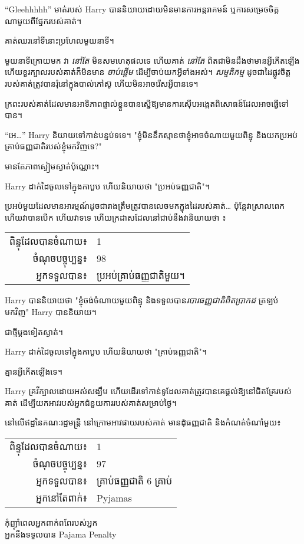 “Gleehhhhh” មាត់របស់ Harry បាននិយាយដោយមិនមានការអន្តរាគមន៍ ឬការសម្រេចចិត្តណាមួយពីផ្នែករបស់គាត់។

គាត់ឈរនៅទីនោះប្រហែលមួយនាទី។

មួយនាទីក្រោយមក វា \emph{នៅតែ} មិនសមហេតុផលទេ ហើយគាត់ \emph{នៅតែ} ពិតជាមិនដឹងថាមានអ្វីកើតឡើង ហើយខួរក្បាលរបស់គាត់ក៏មិនមាន \emph{ចាប់ផ្តើម} ដើម្បីចាប់យកអ្វីទាំងអស់។ \emph{សម្មតិកម្ម} ដូចជាដៃផ្លូវចិត្តរបស់គាត់ត្រូវបានរុំនៅក្នុងបាល់កៅស៊ូ ហើយមិនអាចរើសអ្វីបានទេ។

ក្រពះរបស់គាត់ដែលមានអាទិភាពផ្ទាល់ខ្លួនបានស្នើឱ្យមានការស៊ើបអង្កេតពិសោធន៍ដែលអាចធ្វើទៅបាន។

“អេ…” Harry និយាយទៅកាន់បន្ទប់ទទេ។ "ខ្ញុំមិននឹកស្មានថាខ្ញុំអាចចំណាយមួយពិន្ទុ និងយកប្រអប់គ្រាប់ធញ្ញជាតិរបស់ខ្ញុំមកវិញទេ?"

មានតែភាពស្ងៀមស្ងាត់ប៉ុណ្ណោះ។

Harry ដាក់ដៃចូលទៅក្នុងកាបូប ហើយនិយាយថា "ប្រអប់ធញ្ញជាតិ"។

ប្រអប់​មួយ​ដែល​មាន​អារម្មណ៍​ដូច​ជា​រាង​ត្រឹម​ត្រូវ​បាន​លេច​មក​ក្នុង​ដៃ​របស់​គាត់… ប៉ុន្តែ​វា​ស្រាល​ពេក ហើយ​វា​បាន​បើក ហើយ​វា​ទទេ ហើយ​ក្រដាស​ដែល​នៅ​ជាប់​នឹង​វា​និយាយ​ថា ៖
\begin{writtenNote}
\begin{tabular}{rl}
ពិន្ទុដែលបានចំណាយ៖ & 1\\
ចំណុចបច្ចុប្បន្ន៖ & 98\\
អ្នកទទួលបាន៖ & ប្រអប់គ្រាប់ធញ្ញជាតិមួយ។
\end{tabular}
\end{writtenNote}

Harry បាននិយាយថា "ខ្ញុំចង់ចំណាយមួយពិន្ទុ និងទទួលបាន\emph{របារធញ្ញជាតិពិតប្រាកដ} ត្រឡប់មកវិញ" Harry បាននិយាយ។

ជាថ្មីម្តងទៀតស្ងាត់។

Harry ដាក់ដៃចូលទៅក្នុងកាបូប ហើយនិយាយថា "គ្រាប់ធញ្ញជាតិ"។

គ្មានអ្វីកើតឡើងទេ។

Harry គ្រវីក្បាលដោយអស់សង្ឃឹម ហើយដើរទៅកាន់ទូដែលគាត់ត្រូវបានគេផ្តល់ឱ្យនៅជិតគ្រែរបស់គាត់ ដើម្បីយកអាវរបស់អ្នកជំនួយការរបស់គាត់សម្រាប់ថ្ងៃ។

នៅលើឥដ្ឋនៃគណៈរដ្ឋមន្ត្រី នៅក្រោមអាវផាយរបស់គាត់ មានដុំធញ្ញជាតិ និងកំណត់ចំណាំមួយ៖
\begin{writtenNote}
\begin{tabular}{rl}
ពិន្ទុដែលបានចំណាយ៖ & 1\\
ចំណុចបច្ចុប្បន្ន៖ & 97\\
អ្នកទទួលបាន៖ & គ្រាប់ធញ្ញជាតិ 6 គ្រាប់\\
អ្នកនៅតែពាក់៖ & Pyjamas\\
\end{tabular}

កុំញ៉ាំពេលអ្នកពាក់ពពែរបស់អ្នក\\
អ្នក​នឹង​ទទួល​បាន Pajama Penalty
\end{writtenNote}

